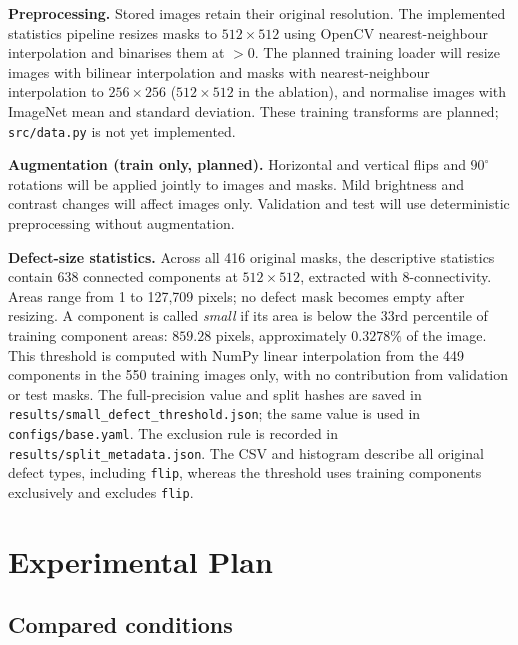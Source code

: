 \documentclass[11pt,a4paper]{article}
\begin{document}
\textbf{Preprocessing.} Stored images retain their original resolution. The implemented statistics pipeline resizes masks to $512\times512$ using OpenCV nearest-neighbour interpolation and binarises them at $>0$. The planned training loader will resize images with bilinear interpolation and masks with nearest-neighbour interpolation to $256\times256$ ($512\times512$ in the ablation), and normalise images with ImageNet mean and standard deviation. These training transforms are planned; \texttt{src/data.py} is not yet implemented.

\textbf{Augmentation (train only, planned).} Horizontal and vertical flips and $90^\circ$ rotations will be applied jointly to images and masks. Mild brightness and contrast changes will affect images only. Validation and test will use deterministic preprocessing without augmentation.

\textbf{Defect-size statistics.} Across all 416 original masks, the descriptive statistics contain 638 connected components at $512\times512$, extracted with 8-connectivity. Areas range from 1 to 127,709 pixels; no defect mask becomes empty after resizing. A component is called \emph{small} if its area is below the 33rd percentile of training component areas: $859.28$ pixels, approximately $0.3278\%$ of the image. This threshold is computed with NumPy linear interpolation from the 449 components in the 550 training images only, with no contribution from validation or test masks. The full-precision value and split hashes are saved in \texttt{results/small\_defect\_threshold.json}; the same value is used in \texttt{configs/base.yaml}. The exclusion rule is recorded in \texttt{results/split\_metadata.json}. The CSV and histogram describe all original defect types, including \texttt{flip}, whereas the threshold uses training components exclusively and excludes \texttt{flip}.

\section{Experimental Plan}

\subsection{Compared conditions}
\end{document}
